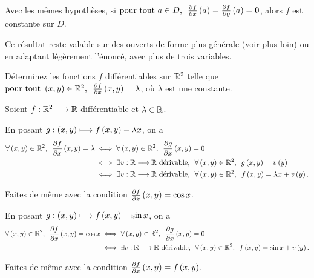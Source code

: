 \begin{cor}
Avec les mêmes hypothèses, si \(\quantifs{\tpt a\in D}\pdv{f}{x}\paren{a}=\pdv{f}{y}\paren{a}=0\), alors \(f\) est constante sur \(D\).
\end{cor}

\begin{rem}
Ce résultat reste valable sur des ouverts de forme plus générale (voir plus loin) ou en adaptant légèrement l'énoncé, avec plus de trois variables.
\end{rem}

\begin{exo}
Déterminez les fonctions \(f\) différentiables sur \(\mathbb{R}^2\) telle que \(\quantifs{\tpt\paren{x,y}\in\R^2}\pdv{f}{x}\paren{x,y}=\lambda\), où \(\lambda\) est une constante.
\end{exo}

\begin{corr}
Soient \(f:\mathbb{R}^2\longrightarrow\mathbb{R}\) différentiable et \(\lambda\in\mathbb{R}\).

En posant \(g:\left(x,y\right)\longmapsto f\left(x,y\right)-\lambda x\), on a \[\begin{aligned}
\quantifs{\forall\paren{x,y}\in\R^2}\pdv{f}{x}\paren{x,y}=\lambda&\ssi\quantifs{\forall\paren{x,y}\in\R^2}\pdv{g}{x}\paren{x,y}=0 \\
&\ssi\quantifs{\exists v:\R\to\R\text{ dérivable}}\quantifs{\forall\paren{x,y}\in\R^2}g\paren{x,y}=v\paren{y} \\
&\ssi\quantifs{\exists v:\R\to\R\text{ dérivable}}\quantifs{\forall\paren{x,y}\in\R^2}f\paren{x,y}=\lambda x+v\paren{y}.
\end{aligned}\]
\end{corr}

\begin{exo}
Faites de même avec la condition \(\pdv{f}{x}\left(x,y\right)=\cos x\).
\end{exo}

\begin{corr}
En posant \(g:\left(x,y\right)\longmapsto f\left(x,y\right)-\sin x\), on a \[\begin{aligned}
\quantifs{\forall\paren{x,y}\in\R^2}\pdv{f}{x}\paren{x,y}=\cos x&\ssi\quantifs{\forall\paren{x,y}\in\R^2}\pdv{g}{x}\paren{x,y}=0 \\
&\ssi\quantifs{\exists v:\R\to\R\text{ dérivable};\forall\paren{x,y}\in\R^2}f\paren{x,y}=\sin x+v\paren{y}.
\end{aligned}\]
\end{corr}

\begin{exo}
Faites de même avec la condition \(\pdv{f}{x}\left(x,y\right)=f\left(x,y\right)\).
\end{exo}


